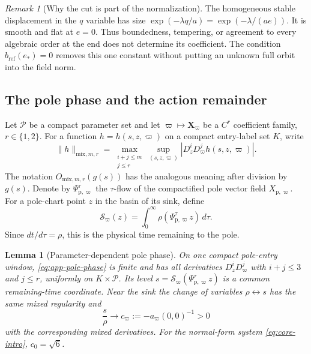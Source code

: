 \documentclass[11pt]{amsart}
\numberwithin{equation}{section}
\newtheorem{lemma}[theorem]{Lemma}
\theoremstyle{definition}
\theoremstyle{remark}
\newtheorem{remark}[theorem]{Remark}
\begin{document}
\begin{remark}[Why the cut is part of the normalization]
The homogeneous stable displacement in the $q$ variable has size
$\exp(-\lambda q/a)=\exp(-\lambda/(ae))$.  It is smooth and flat at
$e=0$.  Thus boundedness, tempering, or agreement to every algebraic order
at the end does not determine its coefficient.  The condition
$b_{\mathrm{ref}}(e_*)=0$ removes this one constant without putting an
unknown full orbit into the field norm.
\end{remark}

\subsection{The pole phase and the action remainder}

Let $\mathcal P$ be a compact parameter set and let
$\varpi\mapsto\mathbf X_\varpi$ be a $C^r$ coefficient family,
$r\in\{1,2\}$.  For a function $h=h(s,z,\varpi)$ on a compact entry-label
set $K$, write
\begin{equation}\label{eq:app-pole-mixed-norm}
 \|h\|_{\mathrm{mix},m,r}
 =\max_{\substack{i+j\le m\\j\le r}}
   \sup_{(s,z,\varpi)}
       |D_z^iD_\varpi^jh(s,z,\varpi)|.
\end{equation}
The notation $O_{\mathrm{mix},m,r}(g(s))$ has the analogous meaning after
division by $g(s)$.  Denote by $\Psi_{\mathrm p,\varpi}^\tau$ the
$\tau$-flow of the compactified pole vector field
$X_{\mathrm p,\varpi}$.  For a pole-chart point $z$ in the basin of its
sink, define
\begin{equation}\label{eq:app-pole-phase}
 \mathcal S_\varpi(z)
 =\int_0^\infty\rho(\Psi_{\mathrm p,\varpi}^\tau z)\,d\tau.
\end{equation}
Since $dt/d\tau=\rho$, this is the physical time remaining to the pole.

\begin{lemma}[Parameter-dependent pole phase]\label{lem:app-pole-phase}
On one compact pole-entry window, \eqref{eq:app-pole-phase} is finite and
has all derivatives $D_z^iD_\varpi^j$ with $i+j\le3$ and $j\le r$,
uniformly on $K\times\mathcal P$.  Its level
$s=\mathcal S_\varpi(\Psi_{\mathrm p,\varpi}^\tau z)$ is a common
remaining-time
coordinate.  Near the sink the change of variables $\rho\leftrightarrow s$
has the same mixed regularity and
\begin{equation}\label{eq:app-pole-phase-ratio}
 \frac{s}{\rho}\longrightarrow
 c_\varpi:=-a_\varpi(0,0)^{-1}>0
\end{equation}
with the corresponding mixed derivatives.  For the normal-form system
\eqref{eq:core-intro}, $c_0=\sqrt6$.
\end{lemma}
\end{document}
